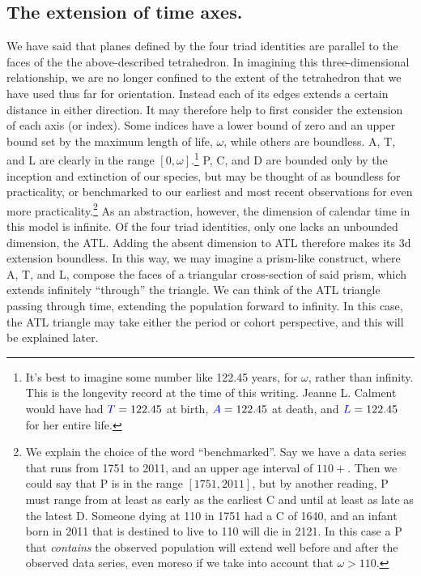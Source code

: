 \documentclass[11pt,oneside,a4paper]{article} %
\newcommand\eg[1]{\textcolor{bl}{#1}}
\begin{document}
\subsection*{The extension of time axes.}
We have said that planes defined by the four triad identities are parallel to
the faces of the the above-described tetrahedron. In imagining this three-dimensional
relationship, we are no longer confined to the extent of the tetrahedron that
we have used thus far for orientation. Instead each of its edges extends a
certain distance in either direction.
It may therefore help to first consider the extension of each axis (or index).
Some indices have a lower bound of zero and an upper bound set by the maximum
length of life, $\omega$, while others are boundless. \eg{A}, \eg{T}, and \eg{L}
are clearly in the range $[0,\omega]$.\footnote{It's best to imagine some number like 122.45 years, for $\omega$, rather than infinity. This is the longevity record at the time of this writing. Jeanne L. Calment would have had
$\eg{T}=122.45$ at birth, $\eg{A} = 122.45$ at death, and $\eg{L}=122.45$ for
her entire life.} \eg{P}, \eg{C}, and \eg{D} are bounded only by the inception and extinction of
our species, but may be thought of as boundless for practicality, or benchmarked
to our earliest and most recent observations for even more
practicality.\footnote{We explain the choice of the word ``benchmarked''. Say
we have a data series that runs from 1751 to 2011, and an upper age
interval of $110+$. Then we could say that \eg{P} is in the range $[1751,2011]$,
but by another reading, \eg{P} must range from at least as early as the earliest
\eg{C} and until at least as late as the latest \eg{D}. Someone dying at 110 in 1751
had a \eg{C} of 1640, and an infant born in 2011 that is destined to live to 110
will die in 2121. In this case a \eg{P} that \textit{contains} the observed
population will extend well before and after the observed data series, even
moreso if we take into account that $\omega > 110$.} As an abstraction,
however, the dimension of calendar time in this model is infinite. Of the four
triad identities, only one lacks an unbounded dimension, the \eg{ATL}. Adding
the absent dimension to \eg{ATL} therefore makes its 3d extension boundless. In
this way, we may imagine a prism-like construct, where \eg{A}, \eg{T}, and \eg{L}, compose
the faces of a triangular cross-section of said prism, which extends infinitely ``through'' the triangle.
We can think of the \eg{ATL} triangle passing through time, extending the population
forward to infinity. In this case, the \eg{ATL} triangle may take either the period
or cohort perspective, and this will be explained later. 
\end{document}
